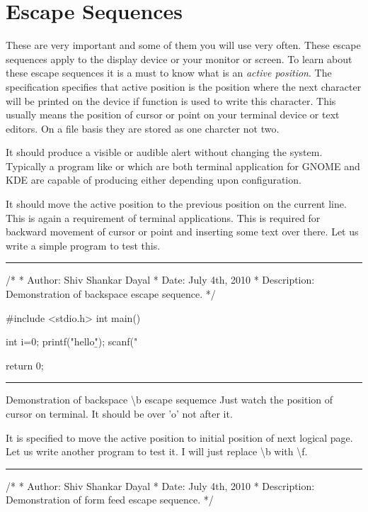 \section{Escape Sequences}
These are very important and some of them you will use very
often. These escape sequences apply to the display device or your
monitor or screen. To learn about these escape sequences it is a must
to know what is an {\it active position}. The specification specifies
that active position is the position where the next character will be
printed on the device if  function is used to write this
character. This usually means the position of cursor or point on your
terminal device or text editors. On a file basis they are stored as
one charcter not two.
\startitemize[n]
\item{}\textreference[alert]It should produce a visible
  or audible alert without changing the system. Typically a program
  like  or  which are both terminal
  application for GNOME and KDE are capable of producing either
  depending upon configuration.
\item{}\textreference[backspace]It should move the
  active position to the previous position on the current line. This
  is again a requirement of terminal applications. This is required
  for backward movement of cursor or point and inserting some text
  over there. Let us write a simple program to test this.
\blank[force,1mm]\hrule\blank[force,1mm]
\startCPP
/*
 * Author: Shiv Shankar Dayal
 * Date: July 4th, 2010
 * Description: Demonstration of backspace escape sequence.
 */

#include <stdio.h>
int main()
{
  int i=0;
  printf("hello\b");
  scanf("%

  return 0;
}
\stopCPP
{}
\hrule
\blank[force,1mm]
\startalignment[middle]
Demonstration of backspace \backslash b escape sequemce
\stopalignment
Just watch the position of cursor on terminal. It should be over 'o' not
after it.
\item{}It is specified to
  move the active position to initial position of next logical
  page. Let us write another program to test it. I will just replace
  \backslash b with \backslash f.
\blank[force,1mm]\hrule\blank[force,1mm]
\startCPP
/*
 * Author: Shiv Shankar Dayal
 * Date: July 4th, 2010
 * Description: Demonstration of form feed escape sequence.
 */

